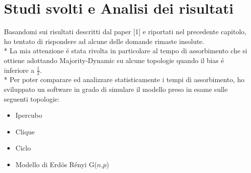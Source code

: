 \documentclass[../Tesi.tex]{subfiles}
\begin{document}
\chapter{Studi svolti e Analisi dei risultati}
Basandomi sui risultati descritti dal paper [1] e riportati nel precedente capitolo, ho tentato di rispondere ad alcune delle domande rimaste insolute.\\*
La mia attenzione \'e stata rivolta in particolare al tempo di assorbimento che si ottiene adottando Majority-Dynamic su alcune topologie quando il bias \'e inferiore a $\frac{1}{2}$.\\*
Per poter comparare ed analizzare statisticamente i tempi di assorbimento, ho sviluppato un software in grado di simulare il modello preso in esame sulle seguenti topologie:
 \begin{itemize}
\item Ipercubo
\item Clique
\item Ciclo
\item Modello di Erd{\"o}s R\'enyi G($n$,$p$)
\end{itemize}
\end{document}
